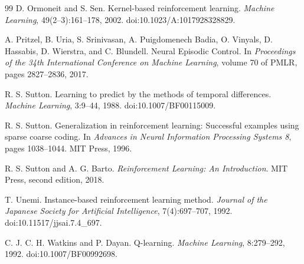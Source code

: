 \documentclass[10pt,twocolumn]{article}
\begin{document}
\begin{thebibliography}{99}
D. Ormoneit and S. Sen.
\newblock Kernel-based reinforcement learning.
\newblock \emph{Machine Learning}, 49(2--3):161--178, 2002.
\newblock doi:10.1023/A:1017928328829.

A. Pritzel, B. Uria, S. Srinivasan, A. Puigdomenech Badia, O. Vinyals, D. Hassabis, D. Wierstra, and C. Blundell.
\newblock Neural Episodic Control.
\newblock In \emph{Proceedings of the 34th International Conference on Machine Learning}, volume 70 of PMLR, pages 2827--2836, 2017.

R. S. Sutton.
\newblock Learning to predict by the methods of temporal differences.
\newblock \emph{Machine Learning}, 3:9--44, 1988.
\newblock doi:10.1007/BF00115009.

R. S. Sutton.
\newblock Generalization in reinforcement learning: Successful examples using sparse coarse coding.
\newblock In \emph{Advances in Neural Information Processing Systems 8}, pages 1038--1044. MIT Press, 1996.

R. S. Sutton and A. G. Barto.
\newblock \emph{Reinforcement Learning: An Introduction}.
\newblock MIT Press, second edition, 2018.


T. Unemi.
\newblock Instance-based reinforcement learning method.
\newblock \emph{Journal of the Japanese Society for Artificial Intelligence}, 7(4):697--707, 1992.
\newblock doi:10.11517/jjsai.7.4\_697.

C. J. C. H. Watkins and P. Dayan.
\newblock Q-learning.
\newblock \emph{Machine Learning}, 8:279--292, 1992.
\newblock doi:10.1007/BF00992698.

\end{thebibliography}
\end{document}
